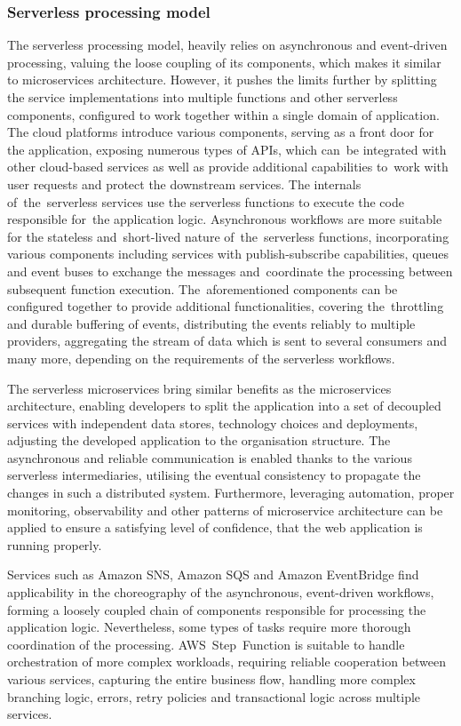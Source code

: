 \subsubsection{Serverless processing model}

The serverless processing model, heavily relies on asynchronous and event-driven processing, valuing the loose coupling of its components, which makes it similar to microservices architecture.
However, it pushes the limits further by splitting the service implementations into multiple functions and other serverless components, configured to work together within a single domain of application.
The cloud platforms introduce various components, serving as a front door for the application, exposing numerous types of APIs, which can~be integrated with other cloud-based services as well as provide additional capabilities to~work with user requests and protect the downstream services.
The internals of~the~serverless services use the serverless functions to execute the code responsible for~the application logic.
Asynchronous workflows are more suitable for the stateless and~short-lived nature of~the~serverless functions, incorporating various components including services with publish-subscribe capabilities, queues and event buses to exchange the messages and~coordinate the processing between subsequent function execution.
The~aforementioned components can be configured together to provide additional functionalities, covering the~throttling and durable buffering of events, distributing the events reliably to multiple providers, aggregating the stream of data which is sent to several consumers and many more, depending on the requirements of the serverless workflows.

The serverless microservices bring similar benefits as the microservices architecture, enabling developers to split the application into a set of decoupled services with independent data stores, technology choices and deployments, adjusting the developed application to the organisation structure.
The asynchronous and reliable communication is enabled thanks to the various serverless intermediaries, utilising the eventual consistency to propagate the changes in such a distributed system.
Furthermore, leveraging automation, proper monitoring, observability and other patterns of microservice architecture can be applied to ensure a satisfying level of confidence, that the web application is running properly.

Services such as Amazon SNS, Amazon SQS and Amazon EventBridge find applicability in the choreography of the asynchronous, event-driven workflows, forming a loosely coupled chain of components responsible for processing the application logic.
Nevertheless, some types of tasks require more thorough coordination of the processing.
AWS~Step~Function is suitable to handle orchestration of more complex workloads, requiring reliable cooperation between various services, capturing the entire business flow, handling more complex branching logic, errors, retry policies and transactional logic across multiple services.

